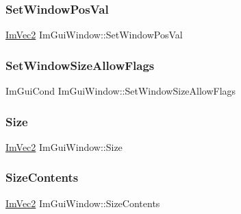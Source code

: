 \subsubsection{\texorpdfstring{Set\+Window\+Pos\+Val}{SetWindowPosVal}}
{\footnotesize\ttfamily \hyperlink{struct_im_vec2}{Im\+Vec2} Im\+Gui\+Window\+::\+Set\+Window\+Pos\+Val}

\hypertarget{struct_im_gui_window_a0c9419d95253214cb2a71d6ead1e03d6}{}\label{struct_im_gui_window_a0c9419d95253214cb2a71d6ead1e03d6} 
\subsubsection{\texorpdfstring{Set\+Window\+Size\+Allow\+Flags}{SetWindowSizeAllowFlags}}
{\footnotesize\ttfamily Im\+Gui\+Cond Im\+Gui\+Window\+::\+Set\+Window\+Size\+Allow\+Flags}

\hypertarget{struct_im_gui_window_a876e7aaf4cd824c8956238fba61387d5}{}\label{struct_im_gui_window_a876e7aaf4cd824c8956238fba61387d5} 
\subsubsection{\texorpdfstring{Size}{Size}}
{\footnotesize\ttfamily \hyperlink{struct_im_vec2}{Im\+Vec2} Im\+Gui\+Window\+::\+Size}

\hypertarget{struct_im_gui_window_a71097695729bf257ccaea824caf306a0}{}\label{struct_im_gui_window_a71097695729bf257ccaea824caf306a0} 
\subsubsection{\texorpdfstring{Size\+Contents}{SizeContents}}
{\footnotesize\ttfamily \hyperlink{struct_im_vec2}{Im\+Vec2} Im\+Gui\+Window\+::\+Size\+Contents}

\hypertarget{struct_im_gui_window_a329d19a8805352b3a116e75e217d2155}{}\label{struct_im_gui_window_a329d19a8805352b3a116e75e217d2155} 
